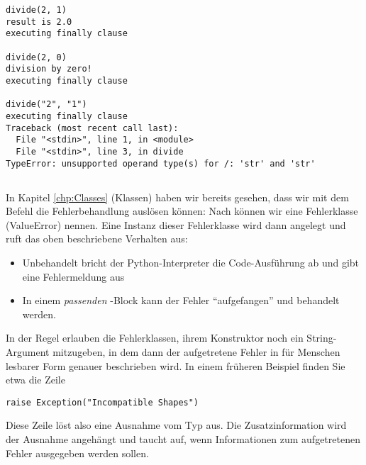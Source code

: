 \begin{cmdbox}
\begin{verbatim}
divide(2, 1)
result is 2.0
executing finally clause

divide(2, 0)
division by zero!
executing finally clause

divide("2", "1")
executing finally clause
Traceback (most recent call last):
  File "<stdin>", line 1, in <module>
  File "<stdin>", line 3, in divide
TypeError: unsupported operand type(s) for /: 'str' and 'str'
\end{verbatim}
\end{cmdbox}



\subsection{}
In Kapitel \ref{chp:Classes} (Klassen) haben wir bereits gesehen, dass wir mit dem Befehl  die Fehlerbehandlung auslösen können: Nach  können wir eine Fehlerklasse (\eg ValueError) nennen. Eine Instanz dieser Fehlerklasse wird dann angelegt und ruft das oben beschriebene Verhalten aus:
\begin{itemize}
\item Unbehandelt bricht der Python-Interpreter die Code-Ausführung ab und gibt eine Fehlermeldung aus
\item In einem \emph{passenden} -Block kann der Fehler \enquote{aufgefangen} und behandelt werden.
\end{itemize}
In der Regel erlauben die Fehlerklassen, ihrem Konstruktor noch ein String-Argument mitzugeben, in dem dann der aufgetretene Fehler in für Menschen lesbarer Form genauer beschrieben wird. In einem früheren Beispiel finden Sie etwa die Zeile
\begin{codebox}
\begin{verbatim}
raise Exception("Incompatible Shapes")
\end{verbatim}
\end{codebox}

Diese Zeile löst also eine Ausnahme vom Typ  aus. Die Zusatzinformation  wird der Ausnahme angehängt und taucht auf, wenn Informationen zum aufgetretenen Fehler ausgegeben werden sollen.


